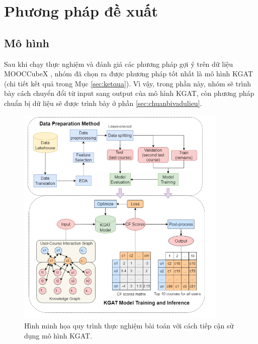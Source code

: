 \section{Phương pháp đề xuất}
\subsection{Mô hình}
Sau khi chạy thực nghiệm và đánh giá các phương pháp gợi ý trên dữ liệu MOOCCubeX \cite{mooccubex}, nhóm đã chọn ra được phương pháp tốt nhất là mô hình KGAT (chi tiết kết quả trong Mục \ref{sec:ketqua}). Vì vậy, trong phần này, nhóm sẽ trình bày cách chuyển đổi từ input sang output của mô hình KGAT, còn phương pháp chuẩn bị dữ liệu sẽ được trình bày ở phần \ref{sec:chuanbivadulieu}.

\begin{figure}[ht]
    \centering
    \includegraphics[width=0.9\textwidth]{figures/69.png}
    \caption{Hình minh họa quy trình thực nghiệm bài toán với cách tiếp cận sử dụng mô hình KGAT.}
    \label{fig:hinh4_1}
\end{figure}


